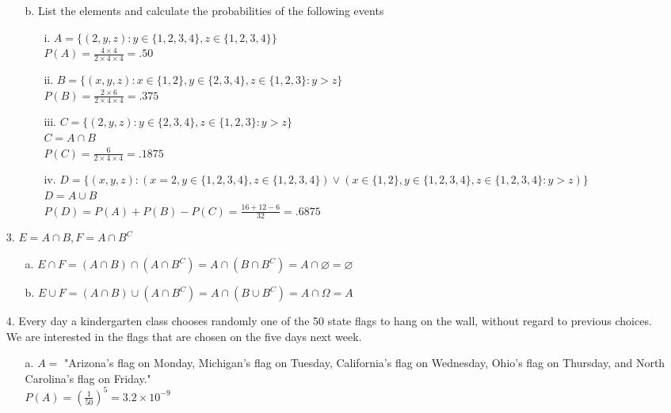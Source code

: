 \documentclass[11pt]{amsart}
\theoremstyle{definition}
\begin{document}
\begin{itemize}
\begin{itemize}
    \item[b.]List the elements and calculate the probabilities of the following events
    \begin{itemize}
        \item[i.]   $A=\{(2,y,z):y\in\{1,2,3,4\},z\in\{1,2,3,4\}\}$ \\
                    $P(A)=\frac{4\times 4}{2\times 4\times 4}=.50$

        \item[ii.]  $B=\{(x,y,z):x\in\{1,2\},y\in\{2,3,4\},z\in\{1,2,3\}:y>z\}$ \\
                    $P(B)=\frac{2\times 6}{2\times 4\times 4}=.375$

        \item[iii.] $C=\{(2,y,z):y\in\{2,3,4\},z\in\{1,2,3\}:y>z\}$ \\
                    $C=A\cap B$ \\
                    $P(C)=\frac{6}{2\times 4\times 4}=.1875$

        \item[iv.]  $D=\{(x,y,z):(x=2,y\in\{1,2,3,4\},z\in\{1,2,3,4\})\lor
                    (x\in\{1,2\},y\in\{1,2,3,4\},z\in\{1,2,3,4\}:y>z)\}$ \\
                    $D=A\cup B$ \\
                    $P(D)=P(A)+P(B)-P(C)=\frac{16+12-6}{32}=.6875$
        
    \end{itemize}
\end{itemize}

\item[3.] $E=A\cap B,F=A\cap B^C$
\begin{itemize}
    \item[a.] $E\cap F=(A\cap B)\cap(A\cap B^C)=A\cap(B\cap B^C)=A\cap\varnothing=\varnothing$

    \item[b.] $E\cup F=(A\cap B)\cup(A\cap B^C)=A\cap(B\cup B^C)=A\cap\Omega=A$
    
\end{itemize}

\item[4.] Every day a kindergarten class chooses randomly one of the 50 state
flags to hang on the wall, without regard to previous choices. We are interested in the flags that are chosen on the five days next week.
\begin{itemize}
    \item[a.] $A=$ "Arizona’s flag on Monday, Michigan’s flag
on Tuesday, California’s flag on Wednesday, Ohio’s flag on Thursday, and North Carolina’s flag on Friday." \\
                $P(A)=(\frac{1}{50})^5=3.2\times 10^{-9}$


\end{itemize}
\end{itemize}
\end{document}

